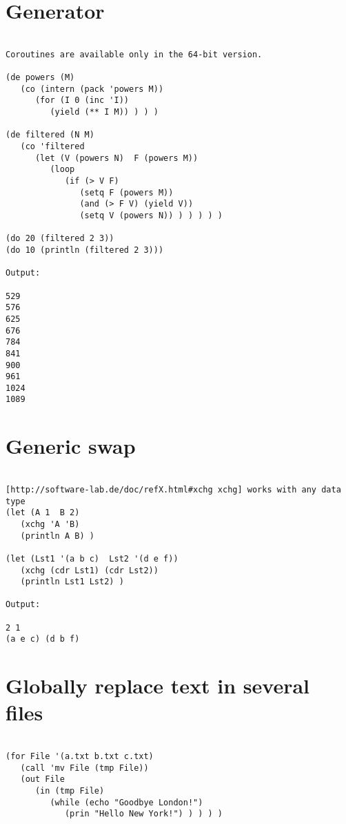 \section*{Generator}

\begin{verbatim}

Coroutines are available only in the 64-bit version.

(de powers (M)
   (co (intern (pack 'powers M))
      (for (I 0 (inc 'I))
         (yield (** I M)) ) ) )

(de filtered (N M)
   (co 'filtered
      (let (V (powers N)  F (powers M))
         (loop
            (if (> V F)
               (setq F (powers M))
               (and (> F V) (yield V))
               (setq V (powers N)) ) ) ) ) )

(do 20 (filtered 2 3))
(do 10 (println (filtered 2 3)))

Output:

529
576
625
676
784
841
900
961
1024
1089

\end{verbatim}

\section*{Generic swap}

\begin{verbatim}

[http://software-lab.de/doc/refX.html#xchg xchg] works with any data type
(let (A 1  B 2)
   (xchg 'A 'B)
   (println A B) )

(let (Lst1 '(a b c)  Lst2 '(d e f))
   (xchg (cdr Lst1) (cdr Lst2))
   (println Lst1 Lst2) )

Output:

2 1
(a e c) (d b f)

\end{verbatim}

\section*{Globally replace text in several files}

\begin{verbatim}

(for File '(a.txt b.txt c.txt)
   (call 'mv File (tmp File))
   (out File
      (in (tmp File)
         (while (echo "Goodbye London!")
            (prin "Hello New York!") ) ) ) )

\end{verbatim}

